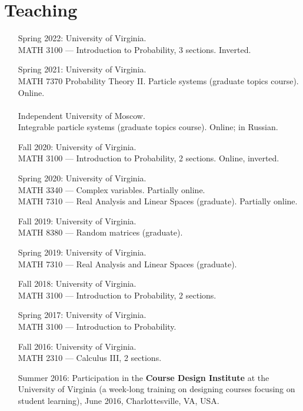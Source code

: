 \documentclass[letterpaper,11pt]{article}
\begin{document}
\section*{Teaching}

\begin{itemize}
	\item[Spring 2022:]
	University of Virginia. \\ MATH 3100 --- Introduction to
	Probability, 3 sections. Inverted.
	\item 
	[Spring 2021:]
	University of Virginia.
	\\
	MATH 7370 Probability Theory II. Particle systems (graduate topics course). Online.
	\\\\
	Independent University of Moscow.
	\\
	Integrable particle systems (graduate topics course). Online; in Russian.
	
\item[Fall 2020:]
	University of Virginia. \\ MATH 3100 --- Introduction to
	Probability, 2 sections. Online, inverted.
	\item 
				[Spring 2020:]
				University of Virginia. 
				\\ 
				MATH 3340 --- Complex variables. Partially online.
				\\
				MATH 7310 --- Real Analysis and Linear Spaces (graduate). Partially online.
	\item 
				[Fall 2019:]
				University of Virginia. \\ MATH 8380 --- Random matrices (graduate).
	\item 
				[Spring 2019:]
				University of Virginia. \\ MATH 7310 --- Real Analysis and Linear Spaces (graduate).
	\item
	      [Fall 2018:]
	      University of Virginia. \\ MATH 3100 --- Introduction to
				Probability, 2 sections.
	\item
	      [Spring 2017:]
	      University of Virginia. \\ MATH 3100 --- Introduction to
	      Probability.

	\item
	      [Fall 2016:]
	      University of Virginia. \\ MATH 2310 --- Calculus III, 2
	      sections.

	\item
	      [Summer 2016:] Participation in the \textbf{Course Design
		      Institute} at
	      the University of Virginia (a week-long training on designing
	      courses focusing on student learning), June 2016, Charlottesville, VA, USA.


\end{itemize}
\end{document}
